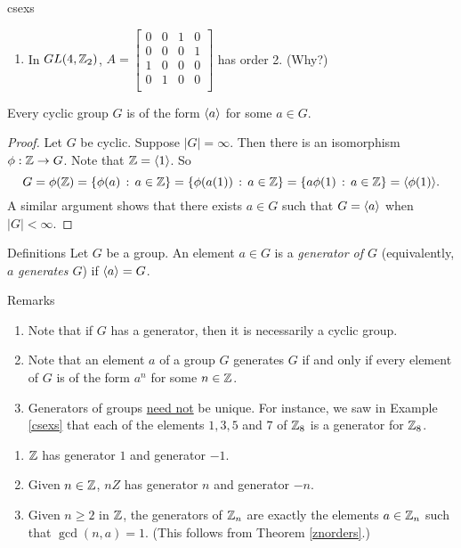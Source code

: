 \begin{example}{csexs}
\begin{enumerate}
\item In $GL(4,\mathbb{Z}_2)$,
 $A=\left[
      \begin{array}{cccc}
        0 & 0 & 1 & 0 \\
        0 & 0 & 0 & 1 \\
        1 & 0 & 0 & 0 \\
        0 & 1 & 0 & 0 \\
      \end{array}
    \right]$ has order 2. (Why?) \end{enumerate}
\end{example}

\begin{thm}\label{} Every cyclic group $G$ is of the form $\langle a\rangle$ for some $a\in G$.\end{thm}

\begin{proof} Let $G$ be cyclic. Suppose $|G|=\infty$. Then there is an isomorphism $\phi: \mathbb{Z}\to G$.  Note that $\mathbb{Z}=\langle1\rangle$. So
$$G=\phi(\mathbb{Z})=\{\phi(a)\,:\,a\in \mathbb{Z}\}=\{\phi(a(1))\,:\,a\in \mathbb{Z}\}=\{a\phi(1)\,:\,a\in \mathbb{Z}\}=\langle\phi(1)\rangle.$$ A similar argument shows that there exists $a\in G$ such that $G=\langle a\rangle$ when $|G|<\infty$.\end{proof}

\begin{df}{Definitions} Let $G$ be a group. An element $a\in G$ is a \textit{generator of $G$} (equivalently, $a$ \textit{generates $G$}) if
$\langle a\rangle=G$.\end{df}

\begin{df}{Remarks}\

 \begin{enumerate}
\item Note that if $G$ has a generator, then it is necessarily a cyclic group.
\item Note that an element $a$ of a group $G$ generates $G$ if and only if every element of $G$ is of the form $a^n$ for some $n\in \mathbb{Z}$.
\item Generators of groups \underline{need not} be unique.  For instance, we saw in Example \ref{csexs} that each of the elements $1,3,5$ and $7$ of $\mathbb{Z}_8$ is a generator for $\mathbb{Z}_8$.
\end{enumerate}
\end{df}

\begin{example}{}
\hspace{10pt}

\begin{enumerate}
\item $\mathbb{Z}$ has generator $1$ and generator $-1$.
\item Given $n\in \mathbb{Z}$, $nZ$ has generator $n$ and generator $-n$.
\item
Given $n\geq 2$ in $\mathbb{Z}$, the generators of $\mathbb{Z}_n$ are exactly  the elements $a\in \mathbb{Z}_n$ such that $\gcd(n,a)=1$. (This follows from Theorem \ref{znorders}.) \end{enumerate}
\end{example}



